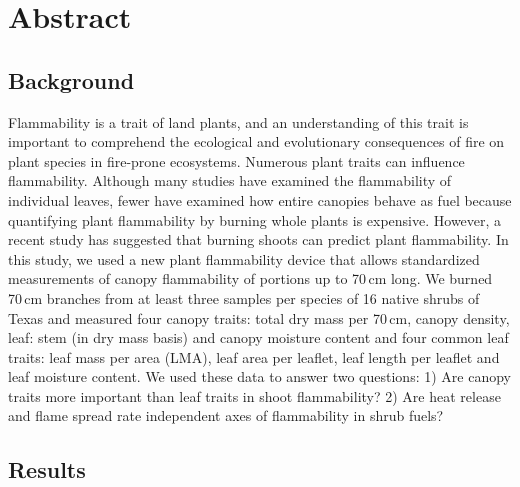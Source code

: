 \documentclass{ttuthes2007}
\begin{document}
\section*{\textbf{Abstract}}
\subsection*{\textbf{Background}}
\noindent Flammability is a trait of land plants, and an understanding of this trait is important to comprehend the ecological and evolutionary consequences of fire on plant species in fire-prone ecosystems. Numerous plant traits can influence flammability. Although many studies have examined the flammability of individual leaves, fewer have examined how entire canopies behave as fuel because quantifying plant flammability by burning whole plants is expensive. However, a recent study has suggested that burning shoots can predict plant flammability. %
In this study, we used a new plant flammability device that allows standardized measurements of canopy flammability of portions up to 70\,cm long. %
We burned 70\,cm branches from at least three samples per species of 16 native shrubs of Texas and measured four canopy traits: total dry mass per 70\,cm, canopy density, leaf: stem (in dry mass basis) and canopy moisture content and four common leaf traits: leaf mass per area (LMA), leaf area per leaflet, leaf length per leaflet and leaf moisture content. We used these data to answer two questions: 1) Are canopy traits more important than leaf traits in shoot flammability? 2) Are heat release and flame spread rate independent axes of flammability in shrub fuels? 
\subsection*{\textbf{Results}}
\end{document}

